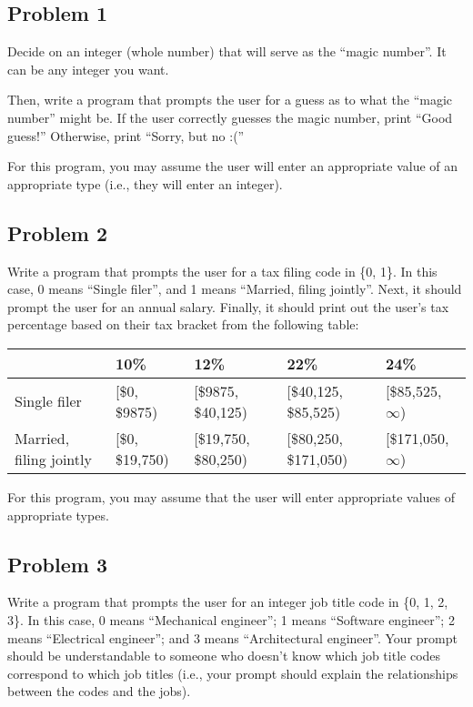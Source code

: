 \documentclass{article}
\begin{document}
\subsection{Problem 1}
\label{problem:guess}

Decide on an integer (whole number) that will serve as the ``magic number''. It can be any integer you want.

Then, write a program that prompts the user for a guess as to what the ``magic number'' might be. If the user correctly guesses the magic number, print ``Good guess!'' Otherwise, print ``Sorry, but no :(''

For this program, you may assume the user will enter an appropriate value of an appropriate type (i.e., they will enter an integer).

\subsection{Problem 2}

Write a program that prompts the user for a tax filing code in \{0, 1\}. In this case, 0 means ``Single filer'', and 1 means ``Married, filing jointly''. Next, it should prompt the user for an annual salary. Finally, it should print out the user's tax percentage based on their tax bracket from the following table:

\begin{tabular}{|l|llll|}
    \hline
    & 10\% & 12\% & 22\% & 24\% \\
    \hline
    Single filer & [\$0, \$9875) & [\$9875, \$40{,}125) & [\$40{,}125, \$85{,}525) & [\$85{,}525, $\infty$) \\
    Married, filing jointly & [\$0, \$19{,}750) & [\$19{,}750, \$80{,}250) & [\$80{,}250, \$171{,}050) & [\$171{,}050, $\infty$) \\
    \hline
\end{tabular}

For this program, you may assume that the user will enter appropriate values of appropriate types.

\subsection{Problem 3}

Write a program that prompts the user for an integer job title code in \{0, 1, 2, 3\}. In this case, 0 means ``Mechanical engineer''; 1 means ``Software engineer''; 2 means ``Electrical engineer''; and 3 means ``Architectural engineer''. Your prompt should be understandable to someone who doesn't know which job title codes correspond to which job titles (i.e., your prompt should explain the relationships between the codes and the jobs).
\end{document}

